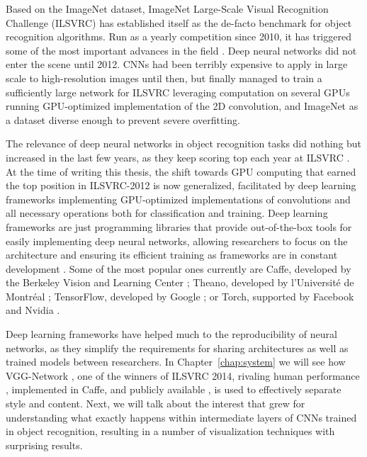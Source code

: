 Based on the ImageNet dataset, ImageNet Large-Scale Visual Recognition Challenge (ILSVRC) has established itself as the de-facto benchmark for object recognition algorithms.
Run as a yearly competition since 2010, it has triggered some of the most important advances in the field \cite{Russakovsky2015}.
Deep neural networks did not enter the scene until 2012.
CNNs had been terribly expensive to apply in large scale to high-resolution images until then, but \citeauthor{Krizhevsky2012} finally managed to train a sufficiently large network for ILSVRC leveraging computation on several GPUs running GPU-optimized implementation of the 2D convolution, and ImageNet as a dataset diverse enough to prevent severe overfitting.

The relevance of deep neural networks in object recognition tasks did nothing but increased in the last few years, as they keep scoring top each year at ILSVRC \cite{Russakovsky2015}.
At the time of writing this thesis, the shift towards GPU computing that earned the top position in ILSVRC-2012 \cite{Krizhevsky2012} is now generalized, facilitated by deep learning frameworks implementing GPU-optimized implementations of convolutions and all necessary operations both for classification and training.
Deep learning frameworks are just programming libraries that provide out-of-the-box tools for easily implementing deep neural networks, allowing researchers to focus on the architecture and ensuring its efficient training as frameworks are in constant development \cite{Bahrampour2015}.
Some of the most popular ones currently are Caffe, developed by the Berkeley Vision and Learning Center \cite{Jia2014}; Theano, developed by l’Université de Montréal \cite{Bergstra2010}; TensorFlow, developed by Google \cite{Abadi2015}; or Torch, supported by Facebook and Nvidia \cite{Collobert2002}.

Deep learning frameworks have helped much to the reproducibility of neural networks, as they simplify the requirements for sharing architectures as well as trained models between researchers.
In Chapter~\ref{chap:system} we will see how VGG-Network \cite{Simonyan2014}, one of the winners of ILSVRC 2014, rivaling human performance \cite{Russakovsky2015}, implemented in Caffe, and publicly available \cite{Simonyan2014web}, is used to effectively separate style and content.
Next, we will talk about the interest that grew for understanding what exactly happens within intermediate layers of CNNs trained in object recognition, resulting in a number of visualization techniques with surprising results.


